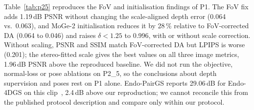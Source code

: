 Table~\ref{tab:p25} reproduces the FoV and initialisation findings of P1. The FoV fix adds 1.19\,dB PSNR without changing the scale-aligned depth error (0.064 vs.\ 0.063), and MoGe-2 initialisation reduces it by 28\,\% relative to FoV-corrected DA (0.064 to 0.046) and raises $\delta{<}1.25$ to 0.996, with or without scale correction. Without scaling, PSNR and SSIM match FoV-corrected DA but LPIPS is worse (0.201); the stereo-fitted scale gives the best values on all three image metrics, 1.96\,dB PSNR above the reproduced baseline. We did not run the objective, normal-loss or pose ablations on P2\_5, so the conclusions about depth supervision and poses rest on P1 alone. Endo-PairGS reports 29.06\,dB for Endo-4DGS on this clip~\cite{yu2026endopairgs}, 2.4\,dB above our reproduction; we cannot reconcile this from the published protocol description and compare only within our protocol.
